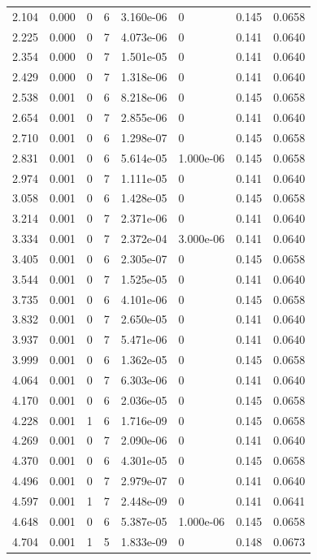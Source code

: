 \documentclass[preview]{standalone}
\begin{document}
{{\begin{tabular}{L{1.2cm}C{1.2cm} C{0.3cm}C{0.5cm} C{1.4cm}C{1.4cm} C{1.4cm}C{1.4cm}}
  2.104  &  0.000  & 0     &  6 &  3.160e-06  & 0  & 0.145 &  0.0658   \\ 
  2.225  &  0.000  & 0     &  7 &  4.073e-06  & 0  & 0.141 &  0.0640   \\ 
  2.354  &  0.000  & 0     &  7 &  1.501e-05  & 0  & 0.141 &  0.0640   \\ 
  2.429  &  0.000  & 0     &  7 &  1.318e-06  & 0  & 0.141 &  0.0640   \\ 
  2.538  &  0.001  & 0     &  6 &  8.218e-06  & 0  & 0.145 &  0.0658   \\ 
  2.654  &  0.001  & 0     &  7 &  2.855e-06  & 0  & 0.141 &  0.0640   \\ 
  2.710  &  0.001  & 0     &  6 &  1.298e-07  & 0  & 0.145 &  0.0658   \\ 
  2.831  &  0.001  & 0     &  6 &  5.614e-05  & 1.000e-06  & 0.145 &  0.0658   \\ 
  2.974  &  0.001  & 0     &  7 &  1.111e-05  & 0  & 0.141 &  0.0640   \\ 
  3.058  &  0.001  & 0     &  6 &  1.428e-05  & 0  & 0.145 &  0.0658   \\ 
  3.214  &  0.001  & 0     &  7 &  2.371e-06  & 0  & 0.141 &  0.0640   \\ 
  3.334  &  0.001  & 0     &  7 &  2.372e-04  & 3.000e-06  & 0.141 &  0.0640   \\ 
  3.405  &  0.001  & 0     &  6 &  2.305e-07  & 0  & 0.145 &  0.0658   \\ 
  3.544  &  0.001  & 0     &  7 &  1.525e-05  & 0  & 0.141 &  0.0640   \\ 
  3.735  &  0.001  & 0     &  6 &  4.101e-06  & 0  & 0.145 &  0.0658   \\ 
  3.832  &  0.001  & 0     &  7 &  2.650e-05  & 0  & 0.141 &  0.0640   \\ 
  3.937  &  0.001  & 0     &  7 &  5.471e-06  & 0  & 0.141 &  0.0640   \\ 
  3.999  &  0.001  & 0     &  6 &  1.362e-05  & 0  & 0.145 &  0.0658   \\ 
  4.064  &  0.001  & 0     &  7 &  6.303e-06  & 0  & 0.141 &  0.0640   \\ 
  4.170  &  0.001  & 0     &  6 &  2.036e-05  & 0  & 0.145 &  0.0658   \\ 
  4.228  &  0.001  & 1     &  6 &  1.716e-09  & 0  & 0.145 &  0.0658   \\ 
  4.269  &  0.001  & 0     &  7 &  2.090e-06  & 0  & 0.141 &  0.0640   \\ 
  4.370  &  0.001  & 0     &  6 &  4.301e-05  & 0  & 0.145 &  0.0658   \\ 
  4.496  &  0.001  & 0     &  7 &  2.979e-07  & 0  & 0.141 &  0.0640   \\ 
  4.597  &  0.001  & 1     &  7 &  2.448e-09  & 0  & 0.141 &  0.0641   \\ 
  4.648  &  0.001  & 0     &  6 &  5.387e-05  & 1.000e-06  & 0.145 &  0.0658   \\ 
  4.704  &  0.001  & 1     &  5 &  1.833e-09  & 0  & 0.148 &  0.0673   \\ 
\hline 
\end{tabular} 

}}
\end{document}
